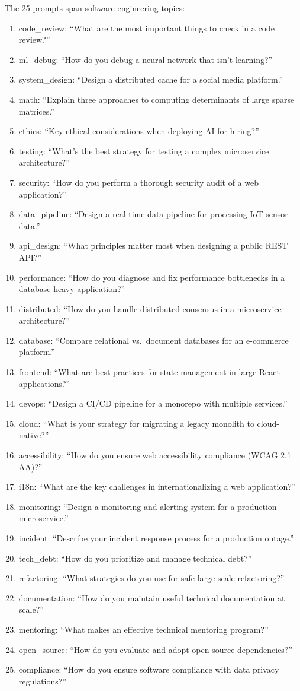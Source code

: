 \documentclass[10pt]{article}
\begin{document}
The 25 prompts span software engineering topics:
\begin{enumerate}[leftmargin=*,itemsep=0pt]
\item code\_review: ``What are the most important things to check in a code review?''
\item ml\_debug: ``How do you debug a neural network that isn't learning?''
\item system\_design: ``Design a distributed cache for a social media platform.''
\item math: ``Explain three approaches to computing determinants of large sparse matrices.''
\item ethics: ``Key ethical considerations when deploying AI for hiring?''
\item testing: ``What's the best strategy for testing a complex microservice architecture?''
\item security: ``How do you perform a thorough security audit of a web application?''
\item data\_pipeline: ``Design a real-time data pipeline for processing IoT sensor data.''
\item api\_design: ``What principles matter most when designing a public REST API?''
\item performance: ``How do you diagnose and fix performance bottlenecks in a database-heavy application?''
\item distributed: ``How do you handle distributed consensus in a microservice architecture?''
\item database: ``Compare relational vs.\ document databases for an e-commerce platform.''
\item frontend: ``What are best practices for state management in large React applications?''
\item devops: ``Design a CI/CD pipeline for a monorepo with multiple services.''
\item cloud: ``What is your strategy for migrating a legacy monolith to cloud-native?''
\item accessibility: ``How do you ensure web accessibility compliance (WCAG 2.1 AA)?''
\item i18n: ``What are the key challenges in internationalizing a web application?''
\item monitoring: ``Design a monitoring and alerting system for a production microservice.''
\item incident: ``Describe your incident response process for a production outage.''
\item tech\_debt: ``How do you prioritize and manage technical debt?''
\item refactoring: ``What strategies do you use for safe large-scale refactoring?''
\item documentation: ``How do you maintain useful technical documentation at scale?''
\item mentoring: ``What makes an effective technical mentoring program?''
\item open\_source: ``How do you evaluate and adopt open source dependencies?''
\item compliance: ``How do you ensure software compliance with data privacy regulations?''
\end{enumerate}
\end{document}
